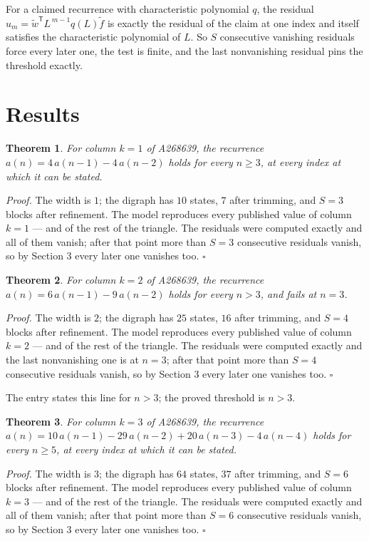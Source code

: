 \documentclass[11pt]{article}
\newtheorem{theorem}{Theorem}
\theoremstyle{definition}
\begin{document}
For a claimed recurrence with characteristic polynomial $q$, the residual $u_m = \tilde w^{\mathsf T}L^{\,m-1}q(L)\tilde f$ is exactly the residual of the claim at one index and itself satisfies the characteristic polynomial of $L$. So $S$ consecutive vanishing residuals force every later one, the test is finite, and the last nonvanishing residual pins the threshold exactly.

\section{Results}

\begin{theorem} For column $k = 1$ of A268639, the recurrence $a(n) = 4\,a(n-1) - 4\,a(n-2)$ holds for every $n \ge 3$, at every index at which it can be stated.\end{theorem}

{\itshape Proof.} The width is $1$; the digraph has $10$ states, $7$ after trimming, and $S = 3$ blocks after refinement. The model reproduces every published value of column $k = 1$ --- and of the rest of the triangle. The residuals were computed exactly and all of them vanish; after that point more than $S = 3$ consecutive residuals vanish, so by Section 3 every later one vanishes too. $\square$

\begin{theorem} For column $k = 2$ of A268639, the recurrence $a(n) = 6\,a(n-1) - 9\,a(n-2)$ holds for every $n > 3$, and fails at $n = 3$.\end{theorem}

{\itshape Proof.} The width is $2$; the digraph has $25$ states, $16$ after trimming, and $S = 4$ blocks after refinement. The model reproduces every published value of column $k = 2$ --- and of the rest of the triangle. The residuals were computed exactly and the last nonvanishing one is at $n = 3$; after that point more than $S = 4$ consecutive residuals vanish, so by Section 3 every later one vanishes too. $\square$

The entry states this line for $n > 3$; the proved threshold is $n > 3$.

\begin{theorem} For column $k = 3$ of A268639, the recurrence $a(n) = 10\,a(n-1) - 29\,a(n-2) + 20\,a(n-3) - 4\,a(n-4)$ holds for every $n \ge 5$, at every index at which it can be stated.\end{theorem}

{\itshape Proof.} The width is $3$; the digraph has $64$ states, $37$ after trimming, and $S = 6$ blocks after refinement. The model reproduces every published value of column $k = 3$ --- and of the rest of the triangle. The residuals were computed exactly and all of them vanish; after that point more than $S = 6$ consecutive residuals vanish, so by Section 3 every later one vanishes too. $\square$
\end{document}
